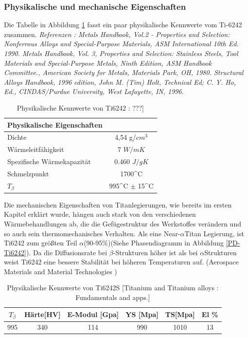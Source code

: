 \subsubsection{ Physikalische und mechanische Eigenschaften }

Die Tabelle in Abbildung \ref{Phy.eig.} fasst ein paar physikalische Kennwerte vom Ti-6242 zusammen.
\newline
\textit{	Referenzen : 
	Metals Handbook, Vol.2 - Properties and Selection: Nonferrous Alloys and Special-Purpose Materials, ASM International 10th Ed. 1990.				
	Metals Handbook, Vol. 3, Properties and Selection: Stainless Steels, Tool Materials and Special-Purpose Metals, Ninth Edition, ASM Handbook Committee., American Society for Metals, Materials Park, OH, 1980.				
	Structural Alloys Handbook, 1996 edition, John M. (Tim) Holt, Technical Ed; C. Y. Ho, Ed., CINDAS/Purdue University, West Lafayette, IN, 1996. }

\begin{table}[H]
	\centering	
	\begin{tabular}{l c}
		
		Physikalische Eigenschaften & \\
		\hline
		Dichte& 4,54 g/$cm^3$\\
		Wärmeleitfähigkeit & 7 $W/mK$ \\
		Spezifische Wärmekapazität & 0.460 $J/gK$\\
		Schmelzpunkt & 1700^\circ C \\
		$T_{\beta}$ &  995^\circ C $\pm$ 15^\circ C \\
		\hline
		
	\end{tabular}
	\caption{Physikalische Kennwerte von Ti6242 : ???]}
	\label{Phy.eig.}
\end{table}


Die mechanischen Eigenschaften von Titanlegierungen, wie bereits im ersten Kapitel erklärt wurde, hängen auch stark von den verschiedenen Wärmebehandlungen ab, die die Gefügestruktur des Werkstoffes  verändern und so auch sein thermomechanisches Verhalten.
Als eine Near-$\alpha$Titan Legierung, ist Ti6242 zum größten Teil $\alpha$(90-95\%)(Siehe Phasendiagramm in Abbildung \ref{PD-Ti6242}). Da die Diffusionsrate bei $\beta$-Strukturen höher ist als bei $\alpha$Strukturen weist Ti6242 eine bessere Stabilität bei höheren Temperaturen auf. (Aerospace Materials and Material Technologies ) 

\begin{table}[H]
	\centering	
	\begin{tabular}{|c| c| c| c| c| c|}										
		\hline
		$T_{\beta}$ & Härte[HV] & E-Modul [Gpa]& YS [Mpa]&TS[Mpa]& El \% \\
		\hline
		995&340&114&990&1010&13\\
		\hline
	\end{tabular}
	\caption{Physikalische Kennwerte von Ti6242S [Titanium and Titanium alloys  : Fundamentals and apps.]}
	\label{Mec.}
\end{table}

